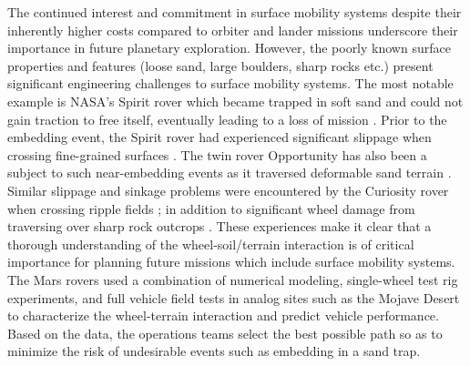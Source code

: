 \documentclass{article}
\begin{document}
The continued interest and commitment in surface mobility systems despite their inherently higher costs compared to orbiter and lander missions underscore their importance in future planetary exploration. However, the poorly known surface properties and features (loose sand, large boulders, sharp rocks etc.) present significant engineering challenges to surface mobility systems. The most notable example is NASA's Spirit rover which became trapped in soft sand and could not gain traction to free itself, eventually leading to a loss of mission \cite{lorenz2014moving}. Prior to the embedding event, the Spirit rover had experienced significant slippage when crossing fine-grained surfaces \cite{li2008characterization}. The twin rover Opportunity has also been a subject to such near-embedding events as it traversed deformable sand terrain \cite{zhou2014simulations,arvidson2011opportunity}. Similar slippage and sinkage problems were encountered by the Curiosity rover when crossing ripple fields \cite{arvidson2014roving}; in addition to significant wheel damage from traversing over sharp rock outcrops \cite{arvidson2017relating}. These experiences make it clear that a thorough understanding of the wheel-soil/terrain interaction is of critical importance for planning future missions which include surface mobility systems. The Mars rovers used a combination of numerical modeling, single-wheel test rig experiments, and full vehicle field tests in analog sites such as the Mojave Desert to characterize the wheel-terrain interaction and predict vehicle performance. Based on the data, the operations teams select the best possible path so as to minimize the risk of undesirable events such as embedding in a sand trap.
\end{document}
